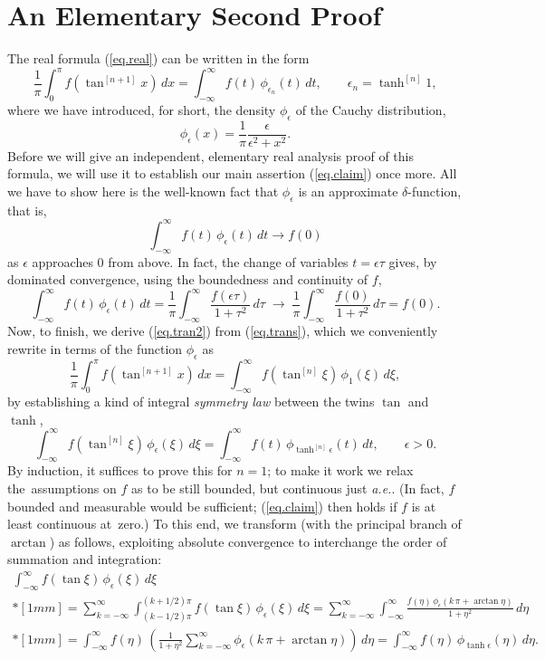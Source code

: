 \documentclass[10pt]{amsart}
\begin{document}
\section{An Elementary Second Proof}\label{sect.real}
\noindent
The real formula (\ref{eq.real}) can be written in the form
\begin{equation}\label{eq.tran2}
\frac{1}{\pi} \int_0^\pi f(\tan^{[n+1]}x)\,dx = \int_{-\infty}^\infty f(t)\,\phi_{\epsilon_n}(t)\,dt,\qquad \epsilon_n = \tanh^{[n]}1,
\end{equation}
where we have introduced, for short, the density $\phi_\epsilon$ of the Cauchy distribution,
\[
\phi_\epsilon(x) = \frac{1}{\pi} \frac{\epsilon}{\epsilon^2+x^2}.
\]
Before we will give an independent, elementary real analysis proof of this formula, we will use it to establish our main assertion (\ref{eq.claim}) once more.
All we have to show here is the well-known fact that $\phi_\epsilon$ is an approximate $\delta$-function, that is,
\[
\int_{-\infty}^\infty f(t)\,\phi_{\epsilon}(t)\,dt \to f(0)
\]
as $\epsilon$ approaches $0$ from above. In fact, the change of variables $t = \epsilon \tau$ gives, by dominated convergence, using
the boundedness and continuity of $f$,
\[
\int_{-\infty}^\infty f(t)\,\phi_{\epsilon}(t) \,dt= \frac{1}{\pi}\int_{-\infty}^\infty \frac{f(\epsilon \tau)}{1+\tau^2}\,d\tau \;\to\; \frac{1}{\pi}\int_{-\infty}^\infty \frac{f(0)}{1+\tau^2}\,d\tau = f(0).
\]
Now, to finish, we derive (\ref{eq.tran2}) from (\ref{eq.trans}), which we conveniently rewrite in terms of the function $\phi_\epsilon$ as
\[
\frac{1}{\pi} \int_0^\pi f(\tan^{[n+1]}x)\,dx = \int_{-\infty}^\infty f(\tan^{[n]}\xi) \,\phi_1(\xi)\,d\xi,
\]
by establishing a kind of integral \emph{symmetry law} between the twins $\tan$ and $\tanh$,
\[
\int_{-\infty}^\infty f(\tan^{[n]}\xi) \,\phi_{\epsilon}(\xi)\,d\xi = \int_{-\infty}^\infty f(t) \,\phi_{\tanh^{[n]}\epsilon}(t)\,dt,\qquad \epsilon > 0.
\]
By induction, it suffices to prove this for $n=1$; to make it work we relax the~assumptions on $f$ as to be still bounded, but continuous just \emph{a.e.}. (In fact, $f$ bounded and measurable would be sufficient;
 (\ref{eq.claim}) then holds if $f$ is at least continuous at~zero.) To this end, we transform (with the principal branch of $\arctan$) as follows,
exploiting absolute convergence to interchange the order of summation and integration:
\begin{multline*}
\int_{-\infty}^\infty f(\tan \xi) \,\phi_{\epsilon}(\xi)\,d\xi \\*[1mm]
= \sum_{k=-\infty}^\infty\int_{(k-1/2)\pi}^{(k+1/2)\pi}f(\tan \xi) \,\phi_{\epsilon}(\xi)\,d\xi
= \sum_{k=-\infty}^\infty\int_{-\infty}^{\infty}  \frac{f(\eta) \,\phi_\epsilon(k\,\pi+\arctan\eta)}{1+\eta^2}\,d\eta\\*[1mm]
= \int_{-\infty}^{\infty} f(\eta)\, \left( \frac{1}{1+\eta^2} \sum_{k=-\infty}^\infty \phi_\epsilon(k\,\pi+\arctan\eta) \right) \,d\eta
= \int_{-\infty}^{\infty} f(\eta)\, \phi_{\tanh\epsilon}(\eta)\,d\eta.
\end{multline*}
\end{document}
